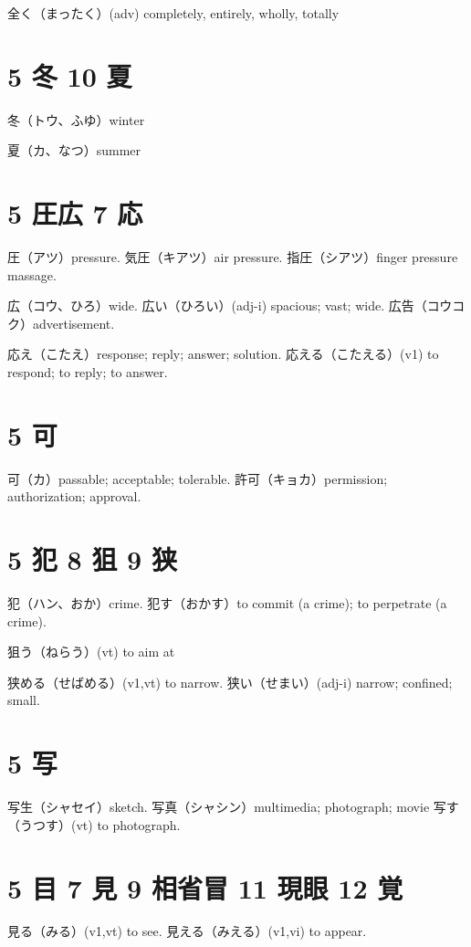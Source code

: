 全く（まったく）(adv) completely, entirely, wholly, totally

\section{5 冬 10 夏}

冬（トウ、ふゆ）winter

夏（カ、なつ）summer

\section{5 圧広 7 応}

圧（アツ）pressure.
気圧（キアツ）air pressure.
指圧（シアツ）finger pressure massage.

広（コウ、ひろ）wide.
広い（ひろい）(adj-i) spacious; vast; wide.
広告（コウコク）advertisement.

応え（こたえ）response; reply; answer; solution.
応える（こたえる）(v1) to respond; to reply; to answer.

\section{5 可}

可（カ）passable; acceptable; tolerable.
許可（キョカ）permission; authorization; approval.

\section{5 犯 8 狙 9 狭}

犯（ハン、おか）crime.
犯す（おかす）to commit (a crime); to perpetrate (a crime).

狙う（ねらう）(vt) to aim at

狭める（せばめる）(v1,vt) to narrow.
狭い（せまい）(adj-i) narrow; confined; small.

\section{5 写}

写生（シャセイ）sketch.
写真（シャシン）multimedia; photograph; movie
写す（うつす）(vt) to photograph.

\section{5 目 7 見 9 相省冒 11 現眼 12 覚}

見る（みる）(v1,vt) to see.
見える（みえる）(v1,vi) to appear.

